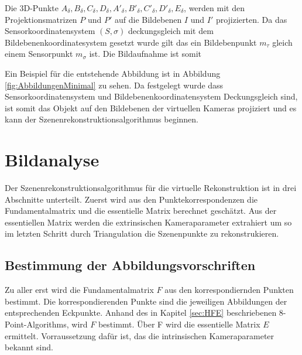 
Die 3D-Punkte $A_\delta,B_\delta,C_\delta,D_\delta,A'_\delta,B'_\delta,C'_\delta,D'_\delta, E_\delta$, werden mit den Projektionsmatrizen \ensuremath{P} und \ensuremath{P'} auf die Bildebenen $I$ und $I'$ projizierten. Da das Sensorkoordinatensystem $(S,\sigma)$ deckungsgleich mit dem Bildebenenkoordinatesystem gesetzt wurde gilt das ein Bildebenpunkt $m_\tau$ gleich einem Sensorpunkt $m_\sigma$ ist. Die Bildaufnahme ist somit 

 Ein Beispiel für die entstehende Abbildung ist in Abbildung \ref{fig:AbbildungenMinimal} zu sehen. Da festgelegt wurde dass Sensorkoordinatensystem und Bildebenenkoordinatensystem Deckungsgleich sind, ist somit das Objekt auf den Bildebenen der virtuellen Kameras projiziert und es kann der Szenenrekonstruktionsalgorithmus beginnen.



\section{Bildanalyse}
\label{sec:MinimalFun}

Der Szenenrekonstruktionsalgorithmus für die virtuelle Rekonstruktion ist in drei Abschnitte unterteilt. Zuerst wird aus den Punktekorrespondenzen die Fundamentalmatrix und die essentielle Matrix berechnet geschätzt. Aus der essentiellen Matrix werden die extrinsischen Kameraparameter extrahiert um so im letzten Schritt durch Triangulation die Szenenpunkte zu rekonstrukieren. 

\subsection{Bestimmung der Abbildungsvorschriften}

Zu aller erst wird die Fundamentalmatrix $F$ aus den korrespondiernden Punkten bestimmt. Die korrespondierenden Punkte sind die jeweiligen Abbildungen der entsprechenden Eckpunkte. Anhand des in Kapitel \ref{sec:HFE} beschriebenen 8-Point-Algorithms, wird $F$ bestimmt. Über F wird die essentielle Matrix $E$ ermittelt. Vorraussetzung dafür ist, das die intrinsischen Kameraparameter bekannt sind.\\


